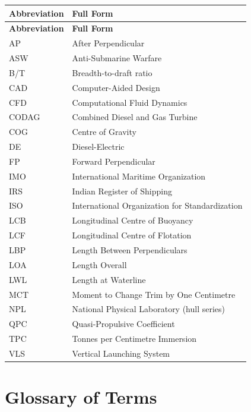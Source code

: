 \begin{appendices}
\begin{longtable}{@{}p{}
                      p{}@{}}
\toprule
\textbf{Abbreviation} & \textbf{Full Form} \\
\midrule
\endfirsthead

\toprule
\textbf{Abbreviation} & \textbf{Full Form} \\
\midrule
\endhead

\bottomrule
\endfoot


AP & After Perpendicular \\
ASW & Anti-Submarine Warfare \\
B/T & Breadth-to-draft ratio \\
CAD & Computer-Aided Design \\
CFD & Computational Fluid Dynamics \\
CODAG & Combined Diesel and Gas Turbine \\
COG & Centre of Gravity \\
DE & Diesel-Electric \\
FP & Forward Perpendicular \\
IMO & International Maritime Organization \\
IRS & Indian Register of Shipping \\
ISO & International Organization for Standardization \\
LCB & Longitudinal Centre of Buoyancy \\
LCF & Longitudinal Centre of Flotation \\
LBP & Length Between Perpendiculars \\
LOA & Length Overall \\
LWL & Length at Waterline \\
MCT & Moment to Change Trim by One Centimetre \\
NPL & National Physical Laboratory (hull series) \\
QPC & Quasi-Propulsive Coefficient \\
TPC & Tonnes per Centimetre Immersion \\
VLS & Vertical Launching System \\

\end{longtable}

\clearpage
\thispagestyle{empty}
\null
\newpage
\chapter{Glossary of Terms}


\end{appendices}
